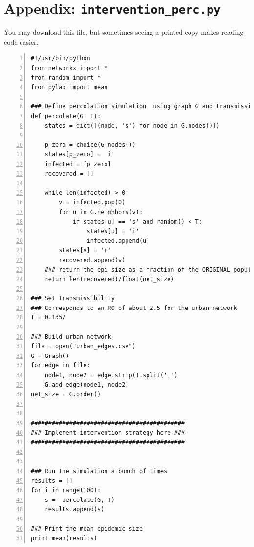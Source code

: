 \documentclass{article}
\begin{document}
\pagebreak
\section*{Appendix: \texttt{intervention\_perc.py}}
You may download this file, but sometimes seeing a printed copy makes reading code easier.
\begin{Verbatim}[numbers=left, samepage=true]
#!/usr/bin/python                                                                                         
from networkx import *                                                                                    
from random import *                                                                                      
from pylab import mean                                                                                    

### Define percolation simulation, using graph G and transmissibility T
def percolate(G, T):                                                   
    states = dict([(node, 's') for node in G.nodes()])                 

    p_zero = choice(G.nodes())
    states[p_zero] = 'i'      
    infected = [p_zero]       
    recovered = []

    while len(infected) > 0:
        v = infected.pop(0)
        for u in G.neighbors(v):
            if states[u] == 's' and random() < T:
                states[u] = 'i'
                infected.append(u)
        states[v] = 'r'
        recovered.append(v)
    ### return the epi size as a fraction of the ORIGINAL population
    return len(recovered)/float(net_size)

### Set transmissibility
### Corresponds to an R0 of about 2.5 for the urban network
T = 0.1357

### Build urban network
file = open("urban_edges.csv")
G = Graph()
for edge in file:
    node1, node2 = edge.strip().split(',')
    G.add_edge(node1, node2)
net_size = G.order()


############################################
### Implement intervention strategy here ###
############################################


### Run the simulation a bunch of times
results = []
for i in range(100):
    s =  percolate(G, T)
    results.append(s)

### Print the mean epidemic size
print mean(results)
\end{Verbatim}
\end{document}
